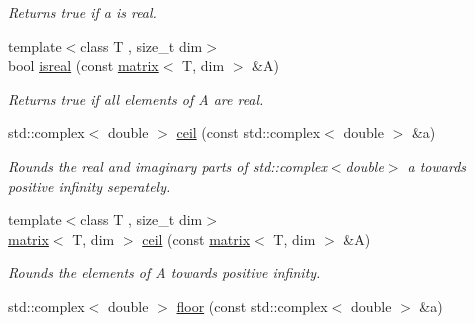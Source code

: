 \begin{DoxyCompactItemize}
\begin{DoxyCompactList}\small\item\em Returns true if a is real. \end{DoxyCompactList}\item 
\hypertarget{namespacekeycpp_af1342fad8b0d8f26c4acc9a65b7ec2dd}{{\footnotesize template$<$class T , size\-\_\-t dim$>$ }\\bool \hyperlink{namespacekeycpp_af1342fad8b0d8f26c4acc9a65b7ec2dd}{isreal} (const \hyperlink{classkeycpp_1_1matrix}{matrix}$<$ T, dim $>$ \&A)}\label{namespacekeycpp_af1342fad8b0d8f26c4acc9a65b7ec2dd}

\begin{DoxyCompactList}\small\item\em Returns true if all elements of A are real. \end{DoxyCompactList}\item 
\hypertarget{namespacekeycpp_a005c1190f7087fb1d2545c38c080fd1a}{std\-::complex$<$ double $>$ \hyperlink{namespacekeycpp_a005c1190f7087fb1d2545c38c080fd1a}{ceil} (const std\-::complex$<$ double $>$ \&a)}\label{namespacekeycpp_a005c1190f7087fb1d2545c38c080fd1a}

\begin{DoxyCompactList}\small\item\em Rounds the real and imaginary parts of std\-::complex$<$double$>$ a towards positive infinity seperately. \end{DoxyCompactList}\item 
\hypertarget{namespacekeycpp_a6f75eb747c57c3e5ff91323f65a02b5f}{{\footnotesize template$<$class T , size\-\_\-t dim$>$ }\\\hyperlink{classkeycpp_1_1matrix}{matrix}$<$ T, dim $>$ \hyperlink{namespacekeycpp_a6f75eb747c57c3e5ff91323f65a02b5f}{ceil} (const \hyperlink{classkeycpp_1_1matrix}{matrix}$<$ T, dim $>$ \&A)}\label{namespacekeycpp_a6f75eb747c57c3e5ff91323f65a02b5f}

\begin{DoxyCompactList}\small\item\em Rounds the elements of A towards positive infinity. \end{DoxyCompactList}\item 
\hypertarget{namespacekeycpp_ab30437496fbd2011521b31aee7961516}{std\-::complex$<$ double $>$ \hyperlink{namespacekeycpp_ab30437496fbd2011521b31aee7961516}{floor} (const std\-::complex$<$ double $>$ \&a)}\label{namespacekeycpp_ab30437496fbd2011521b31aee7961516}


\end{DoxyCompactItemize}
